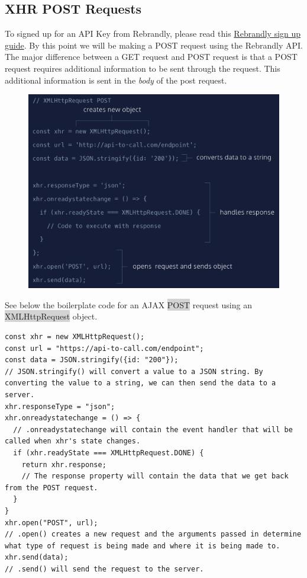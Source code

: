 \documentclass[11pt]{article}
\begin{document}
\subsection{XHR POST Requests}
To signed up for an API Key from Rebrandly, please read this \href{https://www.codecademy.com/articles/rebrandly-signup}{Rebrandly sign up guide}. By this point we will be making a POST request using the Rebrandly API. \\
\newline
The major difference between a GET request and POST request is that a POST request requires additional information to be sent through the request. This additional information is sent in the \textit{body} of the post request.
\begin{figure}[H]
\includegraphics[scale = 0.42]{17_4}
\centering
\end{figure}
See below the boilerplate code for an AJAX \colorbox{lightgray}{POST} request using an \colorbox{lightgray}{XMLHttpRequest} object.
\begin{lstlisting}
const xhr = new XMLHttpRequest(); 
const url = "https://api-to-call.com/endpoint";
const data = JSON.stringify({id: "200"});
// JSON.stringify() will convert a value to a JSON string. By converting the value to a string, we can then send the data to a server.
xhr.responseType = "json"; 
xhr.onreadystatechange = () => {
  // .onreadystatechange will contain the event handler that will be called when xhr's state changes.
  if (xhr.readyState === XMLHttpRequest.DONE) {
    return xhr.response; 
    // The response property will contain the data that we get back from the POST request.
  }
}
xhr.open("POST", url); 
// .open() creates a new request and the arguments passed in determine what type of request is being made and where it is being made to.
xhr.send(data); 
// .send() will send the request to the server.
\end{lstlisting}
\end{document}
